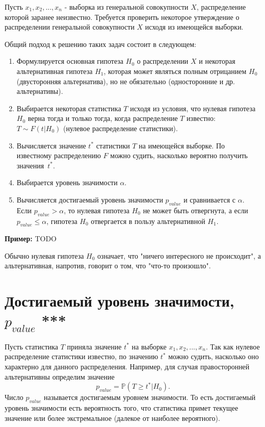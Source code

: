 Пусть $x_1, x_2, ..., x_n$ - выборка из генеральной совокупности $X$, распределение которой заранее неизвестно.
Требуется проверить некоторое утверждение о распределении генеральной совокупности $X$ исходя из имеющейся выборки.

Общий подход к решению таких задач состоит в следующем:
\begin{enumerate}
    \item Формулируется основная гипотеза $H_0$ о распределении $X$ и некоторая альтернативная гипотеза $H_1$, которая может являться полным отрицанием $H_0$ (двусторонняя альтернатива), но не обязательно (односторонние и др. альтернативы).
    \item Выбирается некоторая статистика $T$ исходя из условия, что нулевая гипотеза $H_0$ верна тогда и только тогда, когда распределение $T$ известно: $T \sim F(t|H_0)$ (нулевое распределение статистики). 
    \item Вычисляется значение $t^*$ статистики $T$ на имеющейся выборке. По известному распределению $F$ можно судить, насколько вероятно получить значения~$t^*$.
    \item Выбирается уровень значимости $\alpha$.
    \item Вычисляется достигаемый уровень значимости $p_{value}$ и сравнивается с $\alpha$. Если $p_{value} > \alpha$, то нулевая гипотеза $H_0$ не может быть отвергнута, а если $p_{value} \leqslant \alpha$, гипотеза $H_0$ отвергается в пользу альтернативной $H_1$.
\end{enumerate}

\textbf{Пример:} TODO

Обычно нулевая гипотеза $H_0$ означает, что "ничего интересного не происходит", а альтернативная, напротив, говорит о том, что "что-то произошло".

\section{Достигаемый уровень значимости, $p_{value}$ ***}

Пусть статистика $T$ приняла значение $t^*$ на выборке $x_1, x_2, ..., x_n$. Так как нулевое распределение статистики известно, по значению $t^*$ можно судить, насколько оно характерно для данного распределения. Например, для случая правосторонней альтернативны определим значение
$$
p_{value} = \mathbb{P}(T \geqslant t^* | H_0).
$$
Число $p_{value}$ называется достигаемым уровнем значимости. 
То есть достигаемый уровень значимости есть вероятность того, что статистика примет текущее значение или более экстремальное (далекое от наиболее вероятного). 

